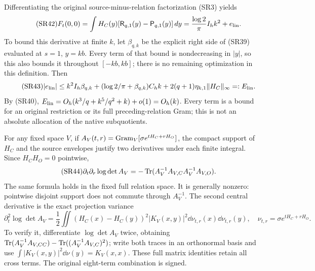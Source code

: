 Differentiating the original source-minus-relation factorization (SR3) yields
\begin{equation}\tag{SR42}
 F_t(0,0)=\int H_C(y)
 [\mathsf R_{q,1}(y)-\mathsf P_{q,1}(y)]\,d y
 =\frac{\log2}{\pi}I_hk^2+e_{\rm lin}.
\end{equation}
To bound this derivative at finite $k$, let $\beta_{q,k}$ be the explicit
right side of (SR39) evaluated at $s=1$, $y=kb$. Every term of that bound is
nondecreasing in $|y|$, so this also bounds it throughout $[-kb,kb]$; there
is no remaining optimization in this definition. Then
\begin{equation}\tag{SR43}
 |e_{\rm lin}|\le
 k^2I_h\beta_{q,k}
 +(\log2/\pi+\beta_{q,k})C_hk
 +2(q+1)\eta_{k,1}\|H_C\|_\infty=:E_{\rm lin}.
\end{equation}
By (SR40), $E_{\rm lin}=O_h(k^3/q+k^5/q^2+k)+o(1)=O_h(k)$.
Every term is a bound for an original restriction or its full preceding-relation
Gram; this is not an absolute allocation of the native subquotients.

For any fixed space $V$, if $A_V(t,r)=\operatorname{Gram}_V[\sigma e^{tH_C+rH_O}]$,
the compact support of $H_C$ and the source envelopes justify two derivatives
under each finite integral. Since $H_CH_O=0$ pointwise,
\begin{equation}\tag{SR44}
 \partial_t\partial_r\log\det A_V
 =-\operatorname{Tr}(A_V^{-1}A_{V,C}A_V^{-1}A_{V,O}).
\end{equation}
The same formula holds in the fixed full relation space. It is generally
nonzero: pointwise disjoint support does not commute through $A_V^{-1}$.
The second central derivative is the exact projection variance
\begin{equation}\tag{SR45}
 \partial_t^2\log\det A_V
 =\frac12\iint(H_C(x)-H_C(y))^2|K_V(x,y)|^2
 \dd\nu_{t,r}(x)\dd\nu_{t,r}(y),\quad
 \nu_{t,r}=\sigma e^{tH_C+rH_O}.
\end{equation}
To verify it, differentiate $\log\det A_V$ twice, obtaining
$\operatorname{Tr}(A_V^{-1}A_{V,CC})-\operatorname{Tr}((A_V^{-1}A_{V,C})^2)$;
write both traces in an orthonormal basis and use
$\int|K_V(x,y)|^2\dd\nu(y)=K_V(x,x)$. These full matrix identities retain
all cross terms. The original eight-term combination is signed.

